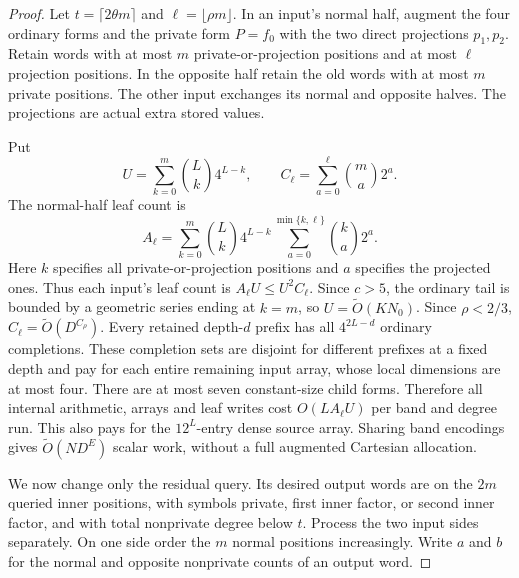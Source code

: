 \documentclass[11pt]{article}
\newcommand{\softO}{\widetilde O}
\begin{document}
\begin{proof}
Let $t=\lceil2\theta m\rceil$ and $\ell=\lfloor\rho m\rfloor$.
In an input's normal half, augment the four ordinary forms and the
private form $P=f_0$ with the two direct projections $p_1,p_2$.
Retain words with at most $m$ private-or-projection positions and at most
$\ell$ projection positions. In the opposite half retain the old words
with at most $m$ private positions. The other input exchanges its normal
and opposite halves. The projections are actual extra stored values.

Put
\[
 U=\sum_{k=0}^{m}\binom Lk4^{L-k},\qquad
 C_\ell=\sum_{a=0}^{\ell}\binom ma2^a.
\]
The normal-half leaf count is
\[
 A_\ell=\sum_{k=0}^{m}\binom Lk4^{L-k}
                   \sum_{a=0}^{\min\{k,\ell\}}\binom ka2^a.
\]
Here $k$ specifies all private-or-projection positions and $a$ specifies
the projected ones. Thus each input's leaf count is
$A_\ell U\le U^2C_\ell$.
Since $c>5$, the ordinary tail is bounded by a geometric series ending
at $k=m$, so $U=\softO(KN_0)$. Since $\rho<2/3$,
$C_\ell=\softO(D^{C_\rho})$.
Every retained depth-$d$ prefix has all $4^{2L-d}$ ordinary completions.
These completion sets are disjoint for different prefixes at a fixed
depth and pay for each entire remaining input array, whose local
dimensions are at most four. There are at most seven constant-size
child forms. Therefore all internal arithmetic, arrays and leaf writes
cost $O(LA_\ell U)$ per band and degree run. This also pays for the
$12^L$-entry dense source array. Sharing band encodings gives
$\softO(ND^E)$ scalar work, without a full augmented Cartesian allocation.

We now change only the residual query. Its desired output words are on
the $2m$ queried inner positions, with symbols private, first inner
factor, or second inner factor, and with total nonprivate degree below
$t$. Process the two input sides separately. On one side order the $m$
normal positions increasingly. Write $a$ and $b$ for the normal and
opposite nonprivate counts of an output word.


\end{proof}
\end{document}
